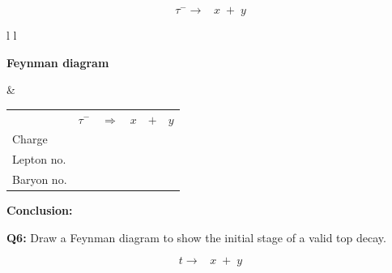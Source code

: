 \documentclass[12pt]{article}
\begin{document}
\vspace{0.4cm}
\[
\tau^- \rightarrow \;\;\; x \;+\; y
\]

\vspace{0.5cm}

\begin{tabular}{l l}

\begin{minipage}[t]{0.46\textwidth}
\vspace{0pt}
\textbf{Feynman diagram}

\vspace{0.6cm}

\begin{tikzpicture}
  \path (0,0) rectangle (6,4.5);
\end{tikzpicture}

\end{minipage}
&
\begin{minipage}[t]{0.50\textwidth}
\vspace{0pt}

\renewcommand{\arraystretch}{1.4}
\begin{tabular}{@{}l c c c c c@{}}
 & \(\tau^-\) & \(\Rightarrow\) & \(x\) & \(+\) & \(y\) \\
Charge &  &  &  &  &  \\
Lepton no. &  &  &  &  &  \\
Baryon no. &  &  &  &  &  \\
\end{tabular}

\end{minipage}

\end{tabular}

\vspace{0.5cm}

\textbf{Conclusion:}

\vspace{2.2cm}

\newpage
\textbf{Q6:} Draw a Feynman diagram to show the initial stage of a valid top decay.

\vspace{0.4cm}
\[
t \rightarrow \;\;\; x \;+\; y
\]

\vspace{0.5cm}
\end{document}
